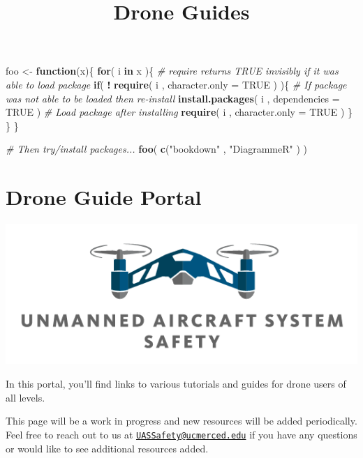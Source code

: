\documentclass[
]{book}
\title{Drone Guides}
\author{}
\date{\vspace{-2.5em}}
\newenvironment{Shaded}{\begin{snugshade}}{\end{snugshade}}
\newcommand{\CommentTok}[1]{\textcolor[rgb]{0.56,0.35,0.01}{\textit{#1}}}
\newcommand{\ControlFlowTok}[1]{\textcolor[rgb]{0.13,0.29,0.53}{\textbf{#1}}}
\newcommand{\DataTypeTok}[1]{\textcolor[rgb]{0.13,0.29,0.53}{#1}}
\newcommand{\KeywordTok}[1]{\textcolor[rgb]{0.13,0.29,0.53}{\textbf{#1}}}
\newcommand{\NormalTok}[1]{#1}
\newcommand{\OperatorTok}[1]{\textcolor[rgb]{0.81,0.36,0.00}{\textbf{#1}}}
\newcommand{\OtherTok}[1]{\textcolor[rgb]{0.56,0.35,0.01}{#1}}
\newcommand{\StringTok}[1]{\textcolor[rgb]{0.31,0.60,0.02}{#1}}
\begin{document}
\maketitle

{
\setcounter{tocdepth}{1}
\tableofcontents
}
\begin{Shaded}
\begin{Highlighting}[]
\NormalTok{foo <-}\StringTok{ }\ControlFlowTok{function}\NormalTok{(x)\{}
  \ControlFlowTok{for}\NormalTok{( i }\ControlFlowTok{in}\NormalTok{ x )\{}
    \CommentTok{#  require returns TRUE invisibly if it was able to load package}
    \ControlFlowTok{if}\NormalTok{( }\OperatorTok{!}\StringTok{ }\KeywordTok{require}\NormalTok{( i , }\DataTypeTok{character.only =} \OtherTok{TRUE}\NormalTok{ ) )\{}
      \CommentTok{#  If package was not able to be loaded then re-install}
      \KeywordTok{install.packages}\NormalTok{( i , }\DataTypeTok{dependencies =} \OtherTok{TRUE}\NormalTok{ )}
      \CommentTok{#  Load package after installing}
      \KeywordTok{require}\NormalTok{( i , }\DataTypeTok{character.only =} \OtherTok{TRUE}\NormalTok{ )}
\NormalTok{    \}}
\NormalTok{  \}}
\NormalTok{\}}

\CommentTok{#  Then try/install packages...}
\KeywordTok{foo}\NormalTok{( }\KeywordTok{c}\NormalTok{(}\StringTok{"bookdown"}\NormalTok{ , }\StringTok{"DiagrammeR"}\NormalTok{ ) )}
\end{Highlighting}
\end{Shaded}

\hypertarget{ch-getting-started}{%
\chapter{Drone Guide Portal}\label{ch-getting-started}}

\begin{center}\includegraphics[width=0.5\linewidth]{images/COE_logo} \end{center}

In this portal, you'll find links to various tutorials and guides for drone users of all levels.

This page will be a work in progress and new resources will be added periodically. Feel free to reach out to us at \href{mailto:UASSafety@ucmerced.edu}{\nolinkurl{UASSafety@ucmerced.edu}} if you have any questions or would like to see additional resources added.
\end{document}
